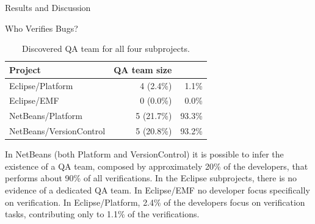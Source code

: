 \begin{section}{Results and Discussion}
\begin{subsection}{Who Verifies Bugs?}
	\begin{table}
		\begin{center}
		\begin{tabular}{l|r|r}
			\textbf{\centering Project} & 
			\textbf{\centering QA team size} & 
			\MyHead{2.5cm}{\textbf{\% of verifications by QA team}} \\
			\hline
			Eclipse/Platform        & 4 (2.4\%)  &  1.1\% \\
			Eclipse/EMF             & 0 (0.0\%)  &  0.0\% \\
			NetBeans/Platform       & 5 (21.7\%) & 93.3\% \\
			NetBeans/VersionControl & 5 (20.8\%) & 93.2\% \\
		\end{tabular}
		\end{center}
		\caption{Discovered QA team for all four subprojects.}
		\label{tab:qa}
	\end{table}
	
	
% 
% 
% 
	
	In NetBeans (both Platform and VersionControl) it is possible to infer the existence of a QA team, composed by approximately 20\% of the developers, that performs about 90\% of all verifications. In the Eclipse subprojects, there is no evidence of a dedicated QA team. In Eclipse/EMF no developer focus specifically on verification. In Eclipse/Platform, 2.4\% of the developers focus on verification tasks, contributing only to 1.1\% of the verifications.
	
	
\end{subsection}

\end{section}

